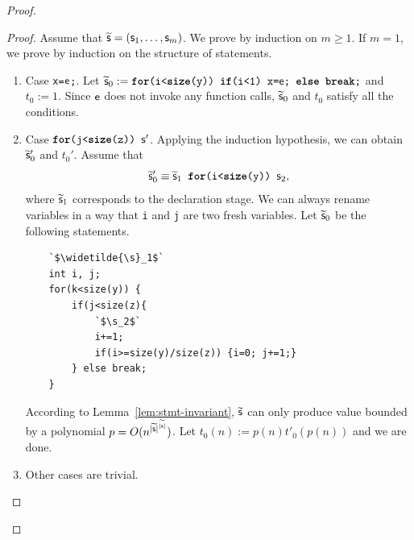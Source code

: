 \documentclass[runningheads]{llncs}
\begin{document}
\begin{proof}
\begin{proof}
    Assume that $\widetilde{\mathsf{s}}=(\mathsf{s}_1,\dots,\mathsf{s}_m)$.
    We prove by induction on $m\ge 1$.
    If $m=1$, we prove by induction on the structure of statements.
    \begin{enumerate}
        \item Case \texttt{x=$\mathsf{e}$;}.
        Let $\widetilde{\mathsf{s}}_0:=\texttt{\textbf{for}(i<\textbf{size}(y)) \textbf{if}(i<1) x=$\mathsf{e}$; \textbf{else} \textbf{break};} $ and $t_0:=1$.
        Since $\mathsf{e}$ does not invoke any function calls, $\widetilde{\mathsf{s}}_0$ and $t_0$ satisfy all the conditions.
        \item Case $\texttt{\textbf{for}(j<\textbf{size}(z)) $\mathsf{s}'$}$.
        Applying the induction hypothesis, we can obtain $\widetilde{\mathsf{s}}_0'$ and $t_0'$.
        Assume that \begin{equation}
        \widetilde{\mathsf{s}}_{0}'\equiv \widetilde{\mathsf{s}}_{1}\texttt{ \textbf{for}(i<\textbf{size}(y)) }\mathsf{s}_{2},
    \end{equation}
    where $\widetilde{\mathsf{s}}_{1}$ corresponds to the declaration stage.  
    We can always rename variables in a way that \texttt{i} and \texttt{j} are two fresh variables.
    Let $\widetilde{\mathsf{s}}_0$ be the following statements.
\begin{lstlisting}
    `$\widetilde{\s}_1$`
    int i, j;
    for(k<size(y)) {
        if(j<size(z){
            `$\s_2$`
            i+=1;
            if(i>=size(y)/size(z)) {i=0; j+=1;}
        } else break;
    }
\end{lstlisting}
        According to Lemma~\ref{lem:stmt-invariant}, $\widetilde{\mathsf{s}}$ can only produce value bounded by a polynomial $p=O(n^{\vert\widetilde{\mathsf{s}}\vert^{\vert\widetilde{\mathsf{s}}\vert}})$.
        Let $t_0(n):=p(n)t'_0(p(n))$ and we are done.
        \item Other cases are trivial.
    \end{enumerate}


\end{proof}
\end{proof}
\end{document}
